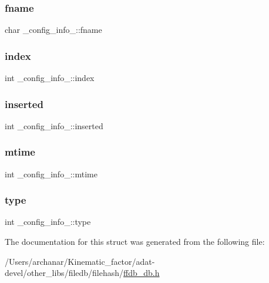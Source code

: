 \mbox{\label{struct__config__info___ab1ec0b2787d132f27ac64dde75f6c3ae}} 
\subsubsection{\texorpdfstring{fname}{fname}}
{\footnotesize\ttfamily char \+\_\+config\+\_\+info\+\_\+\+::fname}

\mbox{\label{struct__config__info___a78aa940c1f0397a3f7acfd7b2ed3a196}} 
\subsubsection{\texorpdfstring{index}{index}}
{\footnotesize\ttfamily int \+\_\+config\+\_\+info\+\_\+\+::index}

\mbox{\label{struct__config__info___a1b87a01f516bd83ef533699c6ac16c92}} 
\subsubsection{\texorpdfstring{inserted}{inserted}}
{\footnotesize\ttfamily int \+\_\+config\+\_\+info\+\_\+\+::inserted}

\mbox{\label{struct__config__info___a57f55946a7e2b18f510873fac9b24a56}} 
\subsubsection{\texorpdfstring{mtime}{mtime}}
{\footnotesize\ttfamily int \+\_\+config\+\_\+info\+\_\+\+::mtime}

\mbox{\label{struct__config__info___af58415103a98083a811c0930139f13dc}} 
\subsubsection{\texorpdfstring{type}{type}}
{\footnotesize\ttfamily int \+\_\+config\+\_\+info\+\_\+\+::type}



The documentation for this struct was generated from the following file\+:\begin{DoxyCompactItemize}
\item 
/\+Users/archanar/\+Kinematic\+\_\+factor/adat-\/devel/other\+\_\+libs/filedb/filehash/\mbox{\hyperlink{adat-devel_2other__libs_2filedb_2filehash_2ffdb__db_8h}{ffdb\+\_\+db.\+h}}\end{DoxyCompactItemize}
